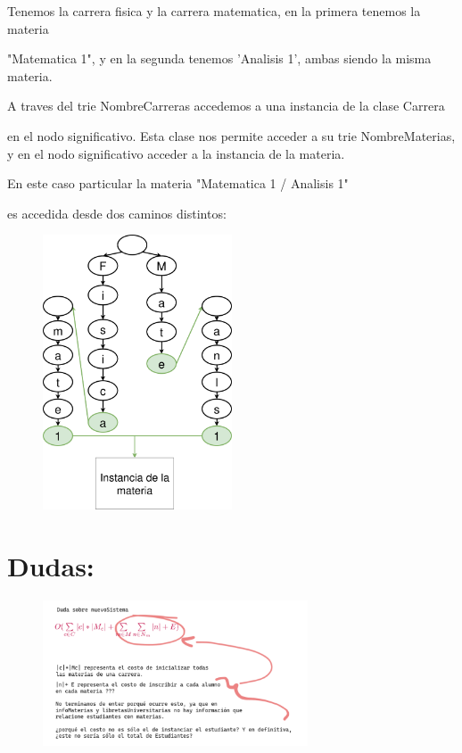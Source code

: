 \documentclass[a4paper,10pt]{article}
\begin{document}
Tenemos la carrera fisica y la carrera matematica, en la primera tenemos la materia

"Matematica 1", y en la segunda tenemos 'Analisis 1', ambas siendo la misma materia.

A traves del trie NombreCarreras accedemos a una instancia de la clase Carrera

en el nodo significativo. Esta clase nos permite acceder a su trie NombreMaterias, y en el nodo significativo acceder a la instancia de la materia.



\pagebreak
\vspace*{15ex}
En este caso particular la materia "Matematica 1 / Analisis 1"

es accedida desde dos caminos distintos:
\salto{\baselineskip}
\begin{figure}[h]
    \centering
    \includegraphics[width=0.5\textwidth]{diagrama1.png}
\end{figure}
\pagebreak
\section*{Dudas:}
\begin{figure}[h]
    \centering
    \includegraphics[width=0.7\textwidth]{duda1.png}
\end{figure}
\pagebreak
\end{document}
